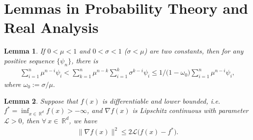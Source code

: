 \documentclass{article} %
\newtheorem{lemma}{Lemma}[section]
\begin{document}
\section{Lemmas in Probability Theory and Real Analysis}
\begin{lemma}\label{exchange}
If $0<\mu<1$ and $0<\sigma<1$ ($\sigma< \mu$) are two constants, then for any positive sequence $\{\psi_{n}\}$, there is
\begin{equation}\nonumber\begin{aligned}
\sum_{i=1}^{n}\mu^{n-i}\psi_{i}<\sum_{k=1}^{n}\mu^{n-k}\sum_{i=1}^{k}\sigma^{k-i}\psi_{i}\le 1/{\big(1-\omega_{0}\big)}\sum_{i=1}^{n}\mu^{n-i}\psi_{i}, \end{aligned}\end{equation} where $\omega_{0}:=\sigma/\mu.$
\end{lemma}

\begin{lemma}\label{loss_bound} %
Suppose that $f(x)$ is differentiable and lower bounded, i.e. $ f^{\ast} = \inf_{x\in \ \mathbb{R}^{d}}f(x) >-\infty$, and $\nabla f(x)$ is Lipschitz continuous with parameter $\mathcal{L} > 0$, then $\forall \ x\in \ \mathbb{R}^{d}$, we have
\begin{align*}
\big\|\nabla f(x)\big\|^{2}\le {2\mathcal{L}}\big(f(x)-f^{*}\big).
\end{align*}
\end{lemma}
\end{document}
